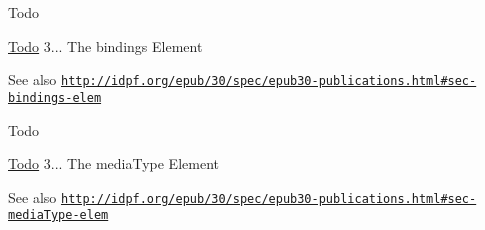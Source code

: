 \begin{DoxyRefDesc}{\-Todo}
\item[\hyperlink{todo__todo000001}{\-Todo}]3... \-The bindings \-Element \end{DoxyRefDesc}
\begin{DoxySeeAlso}{\-See also}
\href{http://idpf.org/epub/30/spec/epub30-publications.html#sec-bindings-elem}{\tt http\-://idpf.\-org/epub/30/spec/epub30-\/publications.\-html\#sec-\/bindings-\/elem}
\end{DoxySeeAlso}
\begin{DoxyRefDesc}{\-Todo}
\item[\hyperlink{todo__todo000002}{\-Todo}]3... \-The media\-Type \-Element \end{DoxyRefDesc}
\begin{DoxySeeAlso}{\-See also}
\href{http://idpf.org/epub/30/spec/epub30-publications.html#sec-mediaType-elem}{\tt http\-://idpf.\-org/epub/30/spec/epub30-\/publications.\-html\#sec-\/media\-Type-\/elem} 
\end{DoxySeeAlso}

